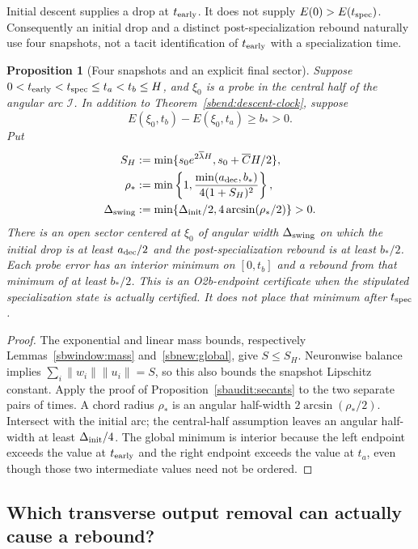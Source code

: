 \documentclass{article} %
\theoremstyle{plain}
\newtheorem{proposition}[theorem]{Proposition}
\theoremstyle{definition}
\theoremstyle{remark}
\begin{document}
Initial descent supplies a drop at $t_{\rm early}$. It does not supply
$E(0)>E(t_{\rm spec})$. Consequently an initial drop and a distinct
post-specialization rebound naturally use four snapshots, not a tacit
identification of $t_{\rm early}$ with a specialization time.

\begin{proposition}[Four snapshots and an explicit final sector]
\label{sbend:four-snapshots}
Suppose $0<t_{\rm early}<t_{\rm spec}\le t_a<t_b\le H$,
and $\xi_0$ is a probe in the central half of the angular arc
$\mathcal I$. In addition to Theorem~\ref{sbend:descent-clock}, suppose
\[
 E(\xi_0,t_b)-E(\xi_0,t_a)\ge b_*>0.
\]
Put
\begin{align}
 S_H&:=\min\{s_0e^{2\overline\lambda H},
                         s_0+\overline C H/2\},\label{sbend:mass-cap}\\
 \rho_*&:=\min\left\{1,
       \frac{\min(a_{\rm dec},b_*)}{4(1+S_H)^2}\right\},\notag\\
 \Delta_{\rm swing}&:=\min\{\Delta_{\rm init}/2,
                                  4\arcsin(\rho_*/2)\}>0.
 \label{sbend:sector-width}
\end{align}
There is an open sector centered at $\xi_0$ of angular width
$\Delta_{\rm swing}$ on which the initial drop is at least
$a_{\rm dec}/2$ and the post-specialization rebound is at least $b_*/2$.
Each probe error has an interior minimum on $[0,t_b]$ and a rebound from
that minimum of at least $b_*/2$. This is an O2b-endpoint certificate when
the stipulated specialization state is actually certified. It does not
place that minimum after $t_{\rm spec}$.
\end{proposition}
\begin{proof}
The exponential and linear mass bounds, respectively
Lemmas~\ref{sbwindow:mass} and~\ref{sbnew:global}, give $S\le S_H$.
Neuronwise balance implies
$\sum_i\|w_i\|\|u_i\|=S$, so this also bounds the snapshot Lipschitz
constant. Apply the proof of Proposition~\ref{sbaudit:secants} to the
two separate pairs of times. A chord radius $\rho_*$ is an angular
half-width $2\arcsin(\rho_*/2)$. Intersect with the initial arc; the
central-half assumption leaves an angular half-width at least
$\Delta_{\rm init}/4$.
The global minimum is interior because the left endpoint exceeds the
value at $t_{\rm early}$ and the right endpoint exceeds the value at
$t_a$, even though those two intermediate values need not be ordered.
\end{proof}

\subsection{Which transverse output removal can actually cause a rebound?}
\end{document}
